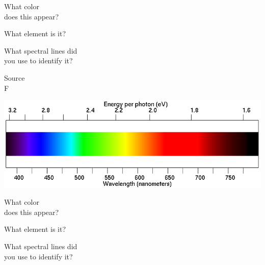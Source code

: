 \documentclass[11pt]{article}
\begin{document}
\begin{minipage}{0.33\textwidth}
	What color \\does this appear?
\end{minipage}
\begin{minipage}{0.33\textwidth}
	What element is it?
\end{minipage}
\begin{minipage}{0.33\textwidth}
	What spectral lines did\\
	you use to identify it?
\end{minipage}

\vspace{1.0in}

\begin{minipage}{0.1\textwidth}
	\begin{center}
		\Large Source \\ F
	\end{center}
\end{minipage}
\begin{minipage}{0.7\textwidth}
	\includegraphics[width=\textwidth]{spectrum2.png}
\end{minipage}

\begin{minipage}{0.33\textwidth}
	What color \\does this appear?
\end{minipage}
\begin{minipage}{0.33\textwidth}
	What element is it?
\end{minipage}
\begin{minipage}{0.33\textwidth}
	What spectral lines did\\
	you use to identify it?
\end{minipage}

\vspace{1.0in}
\end{document}
